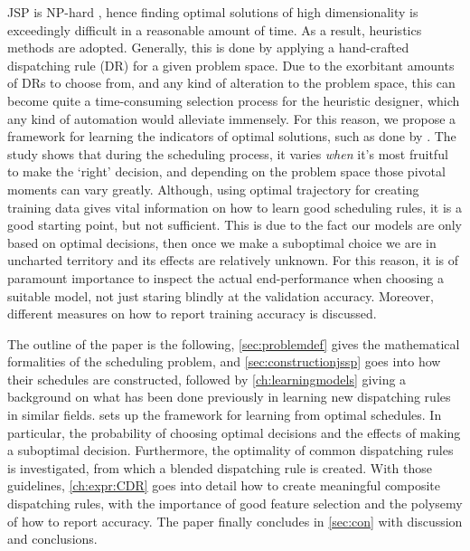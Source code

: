\documentclass[smallextended]{svjour3}
\begin{document}
JSP is NP-hard \cite{Garey76:NPhard}, hence finding optimal solutions of high 
dimensionality is exceedingly difficult in a reasonable amount of time. 
As a result, heuristics methods are adopted. Generally, this is done by 
applying a hand-crafted dispatching rule (DR) for a given problem space. 
Due to the exorbitant amounts of DRs to choose from, and any kind of alteration 
to the problem space, this can become quite a time-consuming selection process 
for the heuristic designer, which any kind of automation would alleviate 
immensely. 
For this reason, we propose a framework for learning the indicators of optimal 
solutions, such as done by \cite{Siggi10}.  The study shows that during the 
scheduling process, it varies \emph{when} it's most fruitful to make the 
`right' decision, and depending on the problem space those pivotal moments can 
vary greatly. 
Although, using optimal trajectory for creating training data gives vital 
information on how to learn good scheduling rules, it is a good starting point, 
but not sufficient. This is due to the fact our models are only based on 
optimal decisions, then once we make a suboptimal choice we are in uncharted 
territory and its effects are relatively unknown. For this reason, it is of 
paramount importance to inspect the actual end-performance when choosing a 
suitable model, not just staring blindly at the validation accuracy. Moreover, 
different measures on how to report training accuracy is discussed.

The outline of the paper is the following, \cref{sec:problemdef} gives the 
mathematical formalities of the scheduling problem, and  
\cref{sec:constructionjssp} goes into how their schedules are constructed, 
followed by \cref{ch:learningmodels} giving a background on what has been done 
previously in learning new dispatching rules in similar fields.  
sets up the framework for learning from optimal schedules. In particular, the 
probability of choosing optimal decisions and the effects of making a 
suboptimal decision. Furthermore, the optimality of common dispatching rules is 
investigated, from which a blended dispatching rule is created. With those 
guidelines, \cref{ch:expr:CDR} goes into detail how to create meaningful 
composite dispatching rules, with the importance of good feature selection and 
the polysemy of how to report accuracy. The paper finally concludes in 
\cref{sec:con} with discussion and conclusions.
\end{document}
